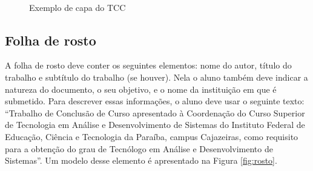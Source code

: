 \begin{center}
\begin{figure}[H]
	\vspace*{0,1cm}
	\centering
	\caption{Exemplo de capa do TCC}
    \label{fig:capa}
    {}\\
\end{figure}
\end{center}

\subsection{Folha de rosto}

A folha de rosto deve conter os seguintes elementos: nome do autor, título do trabalho e subtítulo do trabalho (se houver). Nela o aluno também deve indicar a natureza do documento, o seu objetivo, e o nome da instituição em que é submetido. Para descrever essas informações, o aluno deve usar o seguinte texto: “Trabalho de Conclusão de Curso apresentado à Coordenação do Curso Superior de Tecnologia em Análise e Desenvolvimento de Sistemas do Instituto Federal de Educação, Ciência e Tecnologia da Paraíba, campus Cajazeiras, como requisito para a obtenção do grau de Tecnólogo em Análise e Desenvolvimento de Sistemas”. Um modelo desse elemento é apresentado na Figura \ref{fig:rosto}.


